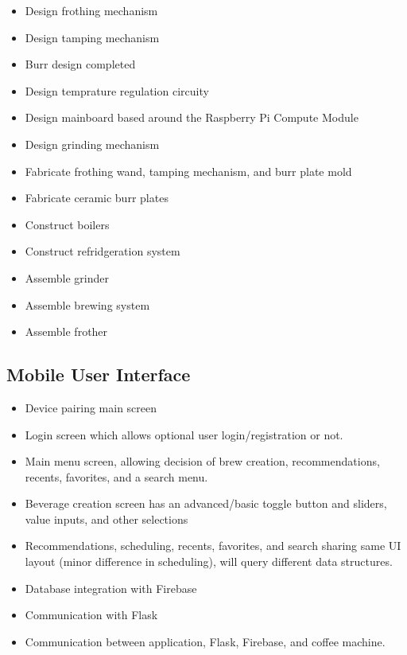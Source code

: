 \documentclass[conference]{IEEEtran}
\begin{document}
\begin{itemize}
\item Design frothing mechanism
\item Design tamping mechanism
\item Burr design completed
\item Design temprature regulation circuity
\item Design mainboard based around the Raspberry Pi Compute Module
\item Design grinding mechanism
\item Fabricate frothing wand, tamping mechanism, and burr plate mold
\item Fabricate ceramic burr plates
\item Construct boilers
\item Construct refridgeration system
\item Assemble grinder
\item Assemble brewing system
\item Assemble frother
\end{itemize}

\subsection{Mobile User Interface}
\begin{itemize}
  \item Device pairing main screen %
  \item Login screen which allows optional user login/registration or not.
  \item Main menu screen, allowing decision of brew creation, recommendations, recents, favorites, and a search menu.
  \item Beverage creation screen has an advanced/basic toggle button and sliders, value inputs, and other selections
  \item Recommendations, scheduling, recents, favorites, and search sharing same UI layout (minor difference in scheduling), will query different data structures.
  \item Database integration with Firebase
  \item Communication with Flask
  \item Communication between application, Flask, Firebase, and coffee machine.
\end{itemize}

\end{document}
